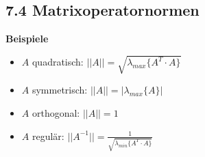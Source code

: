 \subsection{7.4 Matrixoperatornormen}{
\vskip2pt

\begin{center}
\end{center}

\vspace{3pt}

\textbf{Beispiele} \par \vskip1pt
\begin{itemize}[leftmargin=0.29cm, itemsep=0.5pt]
\item $A$ quadratisch: $||A|| = \sqrt{\lambda_{max}\{A^T\cdot A\}}$
\item $A$ symmetrisch: $||A|| = |\lambda_{max}\{A\}|$
\item $A$ orthogonal: $||A|| = 1$
\item $A$ regulär: $||A^{-1}|| = \frac{1}{\sqrt{\lambda_{min}\{A^T\cdot A\}}}$
\end{itemize}

\vspace{-3pt}
}
\WhiteSpace